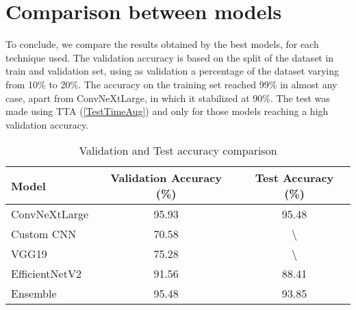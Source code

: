 \section{Comparison between models}
To conclude, we compare the results obtained by the best models, for each technique used.
The validation accuracy is based on the split of the dataset in train and validation set, using as validation a percentage of the dataset varying from 10\% to 20\%.
The accuracy on the training set reached 99\% in almost any case, apart from ConvNeXtLarge, in which it stabilized at 90\%.
The test was made using TTA (\ref{TestTimeAug}) and only for those models reaching a high validation accuracy.
\begin{table}[h!]
    \centering
    \begin{tabular}{lcc} 
        \hline
        Model & Validation Accuracy (\%) & Test Accuracy (\%)\\ 
        \hline
        ConvNeXtLarge  & 95.93 & 95.48 \\
        Custom CNN & 70.58 & \textbackslash \\
        VGG19 & 75.28 & \textbackslash \\
        EfficientNetV2 & 91.56 & 88.41 \\ 
        Ensemble & 95.48 & 93.85 \\
     \hline
    \end{tabular}
    \caption{Validation and Test accuracy comparison}

\end{table}
